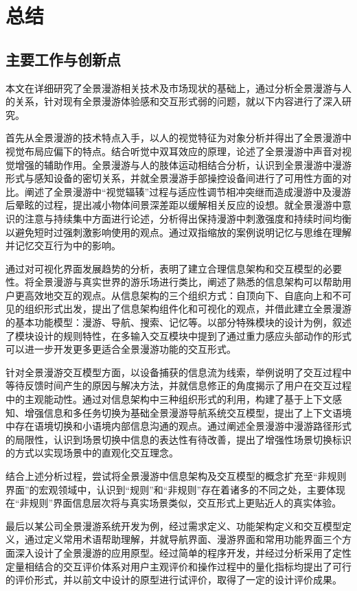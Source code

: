 \chapter{总结}

\section{主要工作与创新点}
本文在详细研究了全景漫游相关技术及市场现状的基础上，通过分析全景漫游与人的关系，针对现有全景漫游体验感和交互形式弱的问题，就以下内容进行了深入研究。

首先从全景漫游的技术特点入手，以人的视觉特征为对象分析并得出了全景漫游中视觉布局应偏下的特点。结合听觉中双耳效应的原理，论述了全景漫游中声音对视觉增强的辅助作用。全景漫游与人的肢体运动相结合分析，认识到全景漫游中漫游形式与感知设备的密切关系，并就全景漫游手部操控设备间进行了可用性方面的对比。阐述了全景漫游中“视觉辐辏”过程与适应性调节相冲突继而造成漫游中及漫游后晕眩的过程，提出减小物体间景深差距以缓解相关反应的设想。就全景漫游中意识的注意与持续集中方面进行论述，分析得出保持漫游中刺激强度和持续时间均衡以避免短时过强刺激影响使用的观点。通过双指缩放的案例说明记忆与思维在理解并记忆交互行为中的影响。

通过对可视化界面发展趋势的分析，表明了建立合理信息架构和交互模型的必要性。将全景漫游与真实世界的游乐场进行类比，阐述了熟悉的信息架构可以帮助用户更高效地交互的观点。从信息架构的三个组织方式：自顶向下、自底向上和不可见的组织形式出发，提出了信息架构组件化和可视化的观点，并借此建立全景漫游的基本功能模型：漫游、导航、搜索、记忆等。以部分特殊模块的设计为例，叙述了模块设计的规则特性，在多输入交互模块中提到了通过重力感应头部动作的形式可以进一步开发更多更适合全景漫游功能的交互形式。

针对全景漫游交互模型方面，以设备捕获的信息流为线索，举例说明了交互过程中等待反馈时间产生的原因与解决方法，并就信息修正的角度揭示了用户在交互过程中的主观能动性。通过对信息架构中三种组织形式的利用，构建了基于上下文感知、增强信息和多任务切换为基础全景漫游导航系统交互模型，提出了上下文语境中存在语境切换和小语境内部信息沟通的观点。通过阐述全景漫游中漫游路径形式的局限性，认识到场景切换中信息的表达性有待改善，提出了增强性场景切换标识的方式以实现场景中的直观化交互理念。

结合上述分析过程，尝试将全景漫游中信息架构及交互模型的概念扩充至“非规则界面”的宏观领域中，认识到“规则”和“非规则”存在着诸多的不同之处，主要体现在“非规则”界面信息层次将与真实场景类似，交互形式上更贴近人的真实体验。

最后以某公司全景漫游系统开发为例，经过需求定义、功能架构定义和交互模型定义，通过定义常用术语帮助理解，并就导航界面、漫游界面和常用功能界面三个方面深入设计了全景漫游的应用原型。经过简单的程序开发，并经过分析采用了定性定量相结合的交互评价体系对用户主观评价和操作过程中的量化指标均提出了可行的评价形式，并以前文中设计的原型进行试评价，取得了一定的设计评价成果。

